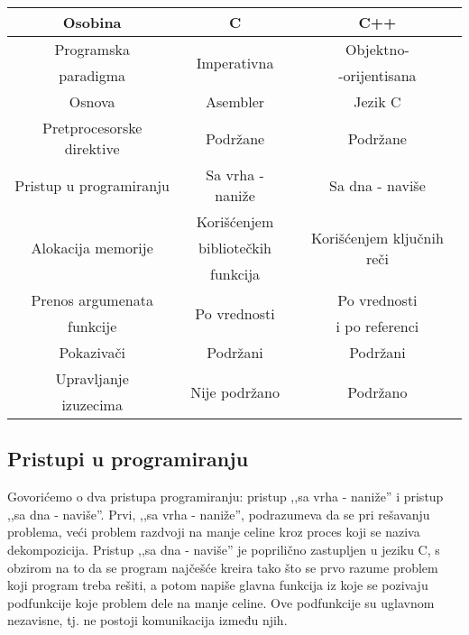 \documentclass[a4paper]{article}
\begin{document}
{%
\begin{tabular}{|c|c|c|}
\hline
Osobina & C & C++ \\
\hline
Programska & \multirow{2}{5.5em}{Imperativna} & Objektno- \\
paradigma & & -orijentisana\\
\hline
Osnova & Asembler & Jezik C \\
\hline
Pretprocesorske direktive & Podržane & Podržane\\
\hline
Pristup u programiranju & Sa vrha - naniže & Sa dna - naviše\\
\hline
\multirow{3}{4em}{Alokacija memorije} & Korišćenjem  & \multirow{3}{5.5em}{Korišćenjem ključnih reči}\\
& bibliotečkih & \\
& funkcija &\\
\hline
Prenos argumenata & \multirow{2}{5.5em}{Po vrednosti} & Po vrednosti\\
funkcije & & i po referenci\\
\hline
Pokazivači & Podržani & Podržani\\
\hline
Upravljanje & \multirow{2}{6.2em}{Nije podržano} & \multirow{2}{4em}{Podržano} \\
izuzecima & &\\
\hline
\end{tabular}

\subsection{Pristupi u programiranju}

Govorićemo o dva pristupa programiranju: pristup ,,sa vrha - naniže'' i pristup ,,sa dna - naviše''. Prvi, ,,sa vrha - naniže'', podrazumeva da se pri rešavanju problema, veći problem razdvoji na manje celine kroz proces koji se naziva dekompozicija. Pristup ,,sa dna - naviše'' je poprilično zastupljen u jeziku C, s obzirom na to da se program najčešće kreira tako što se prvo razume problem koji program treba rešiti, a potom napiše glavna funkcija iz koje se pozivaju podfunkcije koje problem dele na manje celine. Ove podfunkcije su uglavnom nezavisne, tj. ne postoji komunikacija između njih.

}
\end{document}
